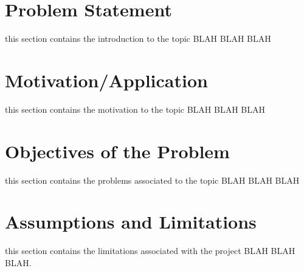 \section{Problem Statement}
this section contains the introduction to the topic BLAH BLAH BLAH
\pagebreak

\section{Motivation/Application}
this section contains the motivation to the topic BLAH BLAH BLAH
\pagebreak

\section{Objectives of the Problem}
this section contains the problems associated to the topic BLAH BLAH BLAH
\pagebreak

\section{Assumptions and Limitations}
this section contains the limitations associated with the project BLAH BLAH BLAH.
\pagebreak